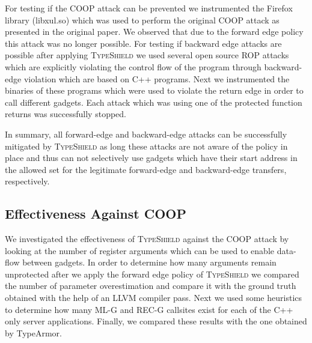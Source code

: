 For testing if the COOP attack can be prevented we instrumented the Firefox library (libxul.so) which was used to perform the original COOP
attack as presented in the original paper. We observed that due to the forward edge policy this attack was no longer possible.
For testing if backward edge attacks are possible after applying \textsc{TypeShield} we used several 
open source ROP attacks which are explicitly violating the control flow of the program through
backward-edge violation which are based on C++ programs.
Next we instrumented the binaries of these programs which were used to violate the return edge in order to call different gadgets.
Each attack which was using one of the protected function returns was successfully stopped. 
 
In summary, all forward-edge and backward-edge attacks can be successfully mitigated by \textsc{TypeShield} as long these attacks are not 
aware of the policy in place and thus can not selectively use gadgets which have their start address in the 
allowed set for the legitimate forward-edge and backward-edge transfers, respectively.

\subsection{Effectiveness Against COOP}
\label{RQ8: Effectiveness Against COOP}
We investigated the effectiveness of \textsc{TypeShield} against the COOP
attack by looking at the number of register arguments which can be used to enable 
data-flow between gadgets. In order to determine how many arguments 
remain unprotected after we apply the forward edge policy of \textsc{TypeShield}
we compared the number of parameter overestimation and compare it with the ground truth
obtained with the help of an LLVM compiler pass. Next we used some heuristics to determine 
how many ML-G and REC-G callsites exist for each of the C++ only server applications.
Finally, we compared these results with the one obtained by TypeArmor.

